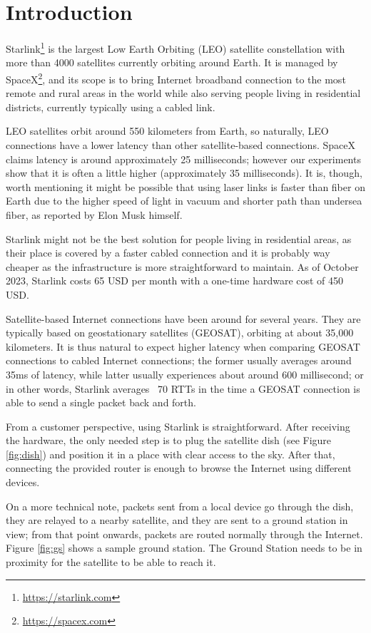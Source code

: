 \documentclass[]{report}
\begin{document}
\section{Introduction}
    
Starlink\footnote{\url{https://starlink.com}} is the largest Low Earth Orbiting (LEO) satellite constellation with more
than 4000 satellites currently orbiting around Earth. It is managed by SpaceX\footnote{\url{https://spacex.com}}, and
its scope is to bring Internet broadband connection to the most remote and rural areas in the world while also serving
people living in residential districts, currently typically using a cabled link.
    
LEO satellites orbit around 550 kilometers from Earth, so naturally, LEO connections have a lower latency than other
satellite-based connections. SpaceX claims latency is around approximately 25 milliseconds; however our experiments show
that it is often a little higher (approximately 35 milliseconds). It is, though, worth mentioning it might be possible
that using laser links is faster than fiber on Earth due to the higher speed of light in vacuum and shorter path than
undersea fiber, as reported by Elon Musk himself\cite{tweet}.

Starlink might not be the best solution for people living in residential areas, as their place is covered by a faster
cabled connection and it is probably way cheaper as the infrastructure is more straightforward to maintain. As of
October 2023, Starlink costs 65 USD per month with a one-time hardware cost of 450 USD. 

Satellite-based Internet connections have been around for several years. They are typically based on geostationary
satellites (GEOSAT), orbiting at about 35,000 kilometers. It is thus natural to expect higher latency when comparing
GEOSAT connections to cabled Internet connections; the former usually averages around 35ms of latency, while latter
usually experiences about around 600 millisecond; or in other words, Starlink averages ~70 RTTs in the time a
GEOSAT connection is able to send a single packet back and forth.
    
From a customer perspective, using Starlink is straightforward. After receiving the hardware, the only needed step is to
plug the satellite dish (see Figure \ref{fig:dish}) and position it in a place with clear access to the sky. After that,
connecting the provided router is enough to browse the Internet using different devices.
    
On a more technical note, packets sent from a local device go through the dish, they are relayed to a nearby satellite,
and they are sent to a ground station in view; from that point onwards, packets are routed normally through the
Internet. Figure \ref{fig:gs} shows a sample ground station. The Ground Station needs to be in proximity for the
satellite to be able to reach it.   
    
\end{document}
